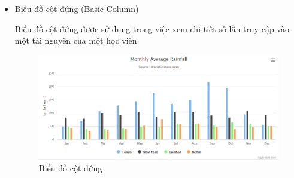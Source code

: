 \begin{itemize}
	\item Biểu đồ cột đứng (Basic Column)
	
	Biểu đồ cột đứng được sử dụng trong việc xem chi tiết số lần truy cập vào một tài nguyên của một học viên
	
	\begin{center}
		\begin{figure}[htp]
			\begin{center}
				\includegraphics[scale=0.7]{img/column}
			\end{center}
			\caption{Biểu đồ cột đứng}
			\label{refhinh80}
		\end{figure}
	\end{center}
	
\end{itemize}
